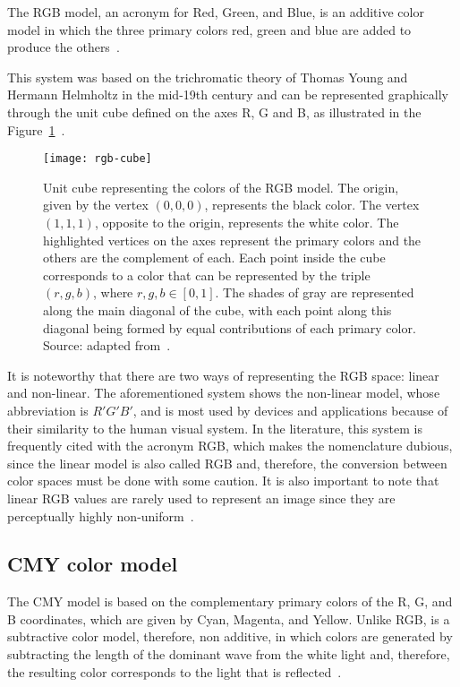 The RGB model, an acronym for Red, Green, and Blue, is an additive color model in which the three primary colors red, green and blue are added to produce the others~\citep{gonzalez:02}.

This system was based on the trichromatic theory of Thomas Young and Hermann Helmholtz in the mid-19th century and can be represented graphically
through the unit cube defined on the axes R, G and B, as illustrated in the Figure~\ref{fig:rgb-cube}~\citep{konstantinos:00}.

\begin{figure}[!ht]
  \centering
  \texttt{[image: rgb-cube]}
  \caption[Unit cube representing the colors of the RGB model]{Unit cube representing the colors of the RGB model. The origin, given by the vertex $(0, 0, 0)$, represents the black color. The vertex $(1, 1, 1)$, opposite to the origin, represents the white color. The highlighted vertices on the axes represent the primary colors and the others are the complement of each. Each point inside the cube corresponds to a color that can be represented by the triple $(r, g, b)$, where $r, g, b \in [0, 1]$. The shades of gray are represented along the main diagonal of the cube, with each point along this diagonal being formed by equal contributions of each primary color. Source: adapted from~\citet{gonzalez:02}.}
  \label{fig:rgb-cube} 
\end{figure}

It is noteworthy that there are two ways of representing the RGB space: linear and non-linear. The aforementioned system shows the non-linear model, whose abbreviation is $R'G'B'$, and is most used by devices and applications because of their similarity to the human visual system. In the literature, this system is frequently cited with the acronym RGB, which makes the nomenclature dubious, since the linear model is also called RGB and, therefore, the conversion between color spaces must be done with some caution. It is also important to note that linear RGB values are rarely used to represent an image since they are perceptually highly non-uniform~\citep{konstantinos:00}.


\subsection{CMY color model}
\label{sec:modelo_cores_cmy}

The CMY model is based on the complementary primary colors of the R, G, and B coordinates, which are given by Cyan, Magenta, and Yellow. Unlike RGB, is a subtractive color model, therefore, non additive, in which colors are generated by subtracting the length of the dominant wave from the white light and, therefore, the resulting color corresponds to the light that is reflected~\citep{gonzalez:02}.

